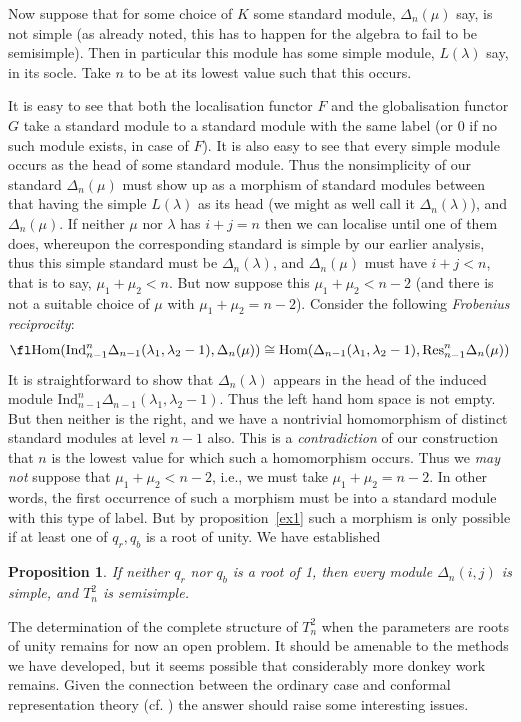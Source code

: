 \documentclass[12pt]{iopart}
\newcommand{\Res}[3]{\mbox{Res}_{#1}^{#2}#3}
\newcommand{\Ind}[3]{\mbox{Ind}_{#1}^{#2}#3}
\newcommand{\Hom}{\mbox{Hom}}
\newtheorem{pr}{Proposition}
\begin{document}
Now suppose that for some choice of $K$ some standard module,
$\Delta_n(\mu)$ say, is not simple (as already noted, this has to
happen for the algebra to fail to be semisimple). Then in particular
this module has some simple module, $L({\lambda})$ say, in its socle.
Take $n$ to be at its lowest value such that this occurs.

It is easy to see that both the localisation functor $F$ and the
globalisation functor $G$ take a standard module to a standard module
with the same label (or 0 if no such module exists, in case of $F$).
It is also easy to see that every simple module occurs as the head of
some standard module.  Thus the nonsimplicity of our standard
$\Delta_n(\mu)$ must show up as a morphism of standard modules between
that having the simple $L(\lambda)$ as its head (we might as well call
it $\Delta_n(\lambda)$), and $\Delta_n(\mu)$.  If neither $\mu$ nor
$\lambda$ has $i+j=n$ then we can localise until one of them does,
whereupon the corresponding standard is simple by our earlier
analysis, thus this simple standard must be $\Delta_n(\lambda)$, and
$\Delta_n(\mu)$ must have $i+j <n$, that is to say, $\mu_1 + \mu_2 <
n$.  But now suppose this $\mu_1 + \mu_2 < n-2$ (and there is not a
suitable choice of $\mu$ with $\mu_1 + \mu_2 = n-2$).  Consider the
following {\em Frobenius reciprocity}:
\[
\fl
\Hom(\Ind{n-1}{n}{} \Delta_{n-1}(\lambda_1,\lambda_2 -1)  ,  
\Delta_n(\mu) ) 
\cong 
\Hom(\Delta_{n-1}(\lambda_1,\lambda_2 -1)  ,  \Res{n-1}{n}{} 
\Delta_n(\mu) )
\]
It is straightforward to show that $\Delta_n(\lambda)$ appears in the
head of the induced module $\Ind{n-1}{n}{}
\Delta_{n-1}(\lambda_1,\lambda_2 -1) $.  Thus the left hand hom space
is not empty. But then neither is the right, and we have a nontrivial
homomorphism of distinct standard modules at level $n-1$ also.  This
is a {\em contradiction}\/ of our construction that $n$ is the lowest
value for which such a homomorphism occurs.  Thus we {\em may not}\/
suppose that $\mu_1 + \mu_2 < n-2$, i.e., we must take $\mu_1 + \mu_2
= n-2$.  In other words, the first occurrence of such a morphism must
be into a standard module with this type of label.  But by
proposition~\ref{ex1} such a morphism is only possible if at least one
of $q_r,q_b$ is a root of unity. We have established
\begin{pr} 
If neither $q_r$ nor $q_b$ is a root of 1, then every module
$\Delta_n(i,j)$ is simple, and $T^2_n$ is semisimple.
\end{pr}

The determination of the complete structure of $T^2_n$ when the
parameters are roots of unity remains for now an open problem.  It
should be amenable to the methods we have developed, but it seems
possible that considerably more donkey work remains.  Given the
connection between the ordinary case and conformal representation
theory (cf. \cite{KooSal,Henkel,MW00}) the answer should raise some
interesting issues.
\end{document}
